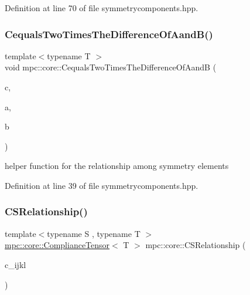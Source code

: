 Definition at line 70 of file symmetrycomponents.\+hpp.

\mbox{\label{namespacempc_1_1core_a243f128e33530a6fca88acd497df1bdd}} 
\subsubsection{\texorpdfstring{Cequals\+Two\+Times\+The\+Difference\+Of\+Aand\+B()}{CequalsTwoTimesTheDifferenceOfAandB()}}
{\footnotesize\ttfamily template$<$typename T $>$ \\
void mpc\+::core\+::\+Cequals\+Two\+Times\+The\+Difference\+Of\+AandB (\begin{DoxyParamCaption}\item[{\mbox{\hyperlink{namespacempc_1_1core_ac3a232afc7c680d580628e834030482f}{mpc\+::core\+::\+Tensor\+Rank4\+Component}}$<$ T $>$ \&}]{c,  }\item[{\mbox{\hyperlink{namespacempc_1_1core_ac3a232afc7c680d580628e834030482f}{mpc\+::core\+::\+Tensor\+Rank4\+Component}}$<$ T $>$ \&}]{a,  }\item[{\mbox{\hyperlink{namespacempc_1_1core_ac3a232afc7c680d580628e834030482f}{mpc\+::core\+::\+Tensor\+Rank4\+Component}}$<$ T $>$ \&}]{b }\end{DoxyParamCaption})}



helper function for the relationship among symmetry elements 



Definition at line 39 of file symmetrycomponents.\+hpp.

\mbox{\label{namespacempc_1_1core_aa7722f016512fa5a038350eb89fce451}} 
\subsubsection{\texorpdfstring{C\+S\+Relationship()}{CSRelationship()}\hspace{0.1cm}{\footnotesize\ttfamily [1/2]}}
{\footnotesize\ttfamily template$<$typename S , typename T $>$ \\
\mbox{\hyperlink{structmpc_1_1core_1_1_compliance_tensor}{mpc\+::core\+::\+Compliance\+Tensor}}$<$ T $>$ mpc\+::core\+::\+C\+S\+Relationship (\begin{DoxyParamCaption}\item[{\mbox{\hyperlink{structmpc_1_1core_1_1_stiffness_tensor}{mpc\+::core\+::\+Stiffness\+Tensor}}$<$ T $>$ \&}]{c\+\_\+ijkl }\end{DoxyParamCaption})}



